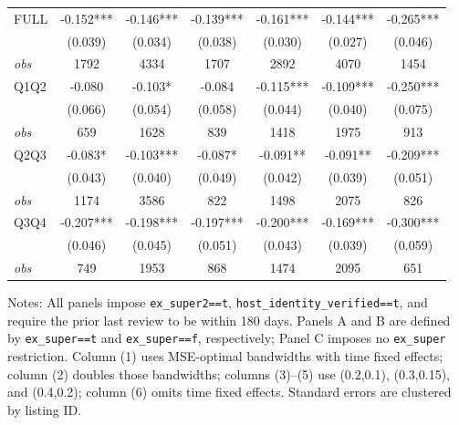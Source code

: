 \begin{table}[!htbp]
\begin{tabular}{lcccccc}
FULL & -0.152*** & -0.146*** & -0.139*** & -0.161*** & -0.144*** & -0.265*** \\
 & (0.039) & (0.034) & (0.038) & (0.030) & (0.027) & (0.046) \\
\textit{obs} & 1792 & 4334 & 1707 & 2892 & 4070 & 1454 \\
Q1Q2 & -0.080 & -0.103* & -0.084 & -0.115*** & -0.109*** & -0.250*** \\
 & (0.066) & (0.054) & (0.058) & (0.044) & (0.040) & (0.075) \\
\textit{obs} & 659 & 1628 & 839 & 1418 & 1975 & 913 \\
Q2Q3 & -0.083* & -0.103*** & -0.087* & -0.091** & -0.091** & -0.209*** \\
 & (0.043) & (0.040) & (0.049) & (0.042) & (0.039) & (0.051) \\
\textit{obs} & 1174 & 3586 & 822 & 1498 & 2075 & 826 \\
Q3Q4 & -0.207*** & -0.198*** & -0.197*** & -0.200*** & -0.169*** & -0.300*** \\
 & (0.046) & (0.045) & (0.051) & (0.043) & (0.039) & (0.059) \\
\textit{obs} & 749 & 1953 & 868 & 1474 & 2095 & 651 \\
\bottomrule
\end{tabular}
\begin{minipage}{0.98\textwidth}\footnotesize
Notes: All panels impose \texttt{ex\_super2==t}, \texttt{host\_identity\_verified==t}, and require the prior last review to be within 180 days. Panels A and B are defined by \texttt{ex\_super==t} and \texttt{ex\_super==f}, respectively; Panel C imposes no \texttt{ex\_super} restriction. Column (1) uses MSE-optimal bandwidths with time fixed effects; column (2) doubles those bandwidths; columns (3)--(5) use (0.2,0.1), (0.3,0.15), and (0.4,0.2); column (6) omits time fixed effects. Standard errors are clustered by listing ID.
\end{minipage}
\end{table}

